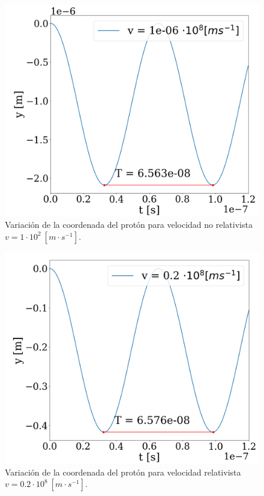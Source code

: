 \documentclass[journal]{IEEEtran}
\begin{document}
\begin{figure}[!htb]
    \centering
    \includegraphics[width=\linewidth]{freq_rel_t_0.png}
    \caption{Variación de la coordenada del protón para velocidad no relativista $v = 1\cdot 10^2~[m\cdot s^{-1}]$.}
    \label{fig:freqrelt0}
\end{figure}

\newpage

\hfill

\begin{figure}[!htb]
    \centering
    \includegraphics[width=\linewidth]{freq_rel_t_1.png}
    \caption{Variación de la coordenada del protón para velocidad relativista $v = 0.2\cdot 10^8~[m\cdot s^{-1}]$.}
    \label{fig:freqrelt1}
\end{figure}
\end{document}
